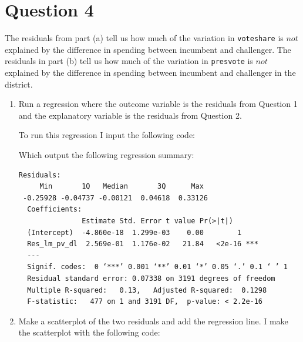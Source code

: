 \documentclass[12pt,letterpaper]{article}
\begin{document}
\section*{Question 4}
\noindent The residuals from part (a) tell us how much of the variation in \texttt{voteshare} is $not$ explained by the difference in spending between incumbent and challenger. The residuals in part (b) tell us how much of the variation in \texttt{presvote} is $not$ explained by the difference in spending between incumbent and challenger in the district.
	\begin{enumerate}
		\item Run a regression where the outcome variable is the residuals from Question 1 and the explanatory variable is the residuals from Question 2.
		
To run this regression I input the following code:


Which output the following regression summary:

			\begin{verbatim}
Residuals:
     Min       1Q   Median       3Q      Max
 -0.25928 -0.04737 -0.00121  0.04618  0.33126
  Coefficients:               
               Estimate Std. Error t value Pr(>|t|)    
  (Intercept)  -4.860e-18  1.299e-03    0.00        1    
  Res_lm_pv_dl  2.569e-01  1.176e-02   21.84   <2e-16 ***
  ---
  Signif. codes:  0 ‘***’ 0.001 ‘**’ 0.01 ‘*’ 0.05 ‘.’ 0.1 ‘ ’ 1
  Residual standard error: 0.07338 on 3191 degrees of freedom
  Multiple R-squared:   0.13,	Adjusted R-squared:  0.1298 
  F-statistic:   477 on 1 and 3191 DF,  p-value: < 2.2e-16				
\end{verbatim} 		
			\vspace{2cm}
		\item Make a scatterplot of the two residuals and add the regression line.
I make the scatterplot with the following code:



\end{enumerate}
\end{document}
